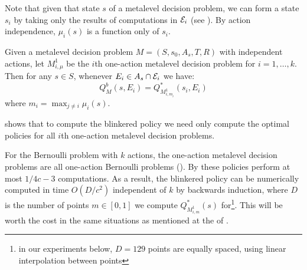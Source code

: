 Note that given that state $s$ of a metalevel decision problem, we can form a state
$s_i$ by taking only the results of computations in $\mathcal{E}_i$ (see ).
By action independence, $\mu_i(s)$ is a function only of $s_i$.

\begin{thm}\label{thm:blinkered}
Given a metalevel decision problem $M=(S,s_0,A_s,T,R)$ with independent actions,
let $M^1_{i,\mu}$ be the $i$th one-action metalevel decision problem for $i=1,\dots,k$.
Then for any $s\in S$, whenever $E_i\in A_s\cap\mathcal{E}_i$ we have:
\[
	Q^b_M(s,E_i) = Q^*_{M^1_{i,m_i}}(s_i, E_i)
\]
where $m_i = \max_{j\neq i} \mu_i(s)$.
\end{thm}

 shows that to compute the blinkered policy we need
only compute the optimal policies for all $i$th one-action metalevel decision problems.

For the Bernoulli problem with $k$ actions, the one-action metalevel decision problems
are all one-action Bernoulli problems ().  By 
these policies perform at most $1/4c - 3$ computations.
As a result, the blinkered policy can be numerically computed in time $O(D/c^2)$ 
independent of $k$ by backwards induction, where $D$ is the number of points $m\in[0,1]$
we compute $Q^*_{M^1_{i,m}}(s)$ for\footnote{in our experiments below, $D=129$ points are equally spaced,
using linear interpolation between points}.  This will be worth the cost in 
the same situations as mentioned at the of .

